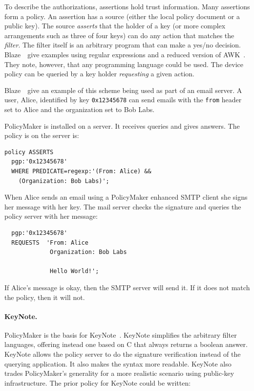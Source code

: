 \documentclass[thesis.tex]{subfiles}
\begin{document}
To describe the authorizations, assertions hold trust information.
Many assertions form a policy. An assertion has a source (either the
local policy document or a public key). The source \emph{asserts} that
the holder of a key (or more complex arrangements such as three of
four keys) can do any action that matches the \emph{filter}. The
filter itself is an arbitrary program that can make a yes/no decision.
Blaze~\etal~give examples using regular expressions and a reduced
version of AWK~\cite{aho_awk-pattern_1979}. They note, however, that
any programming language could be used. The device policy can be
queried by a key holder \emph{requesting} a given action.

Blaze~\etal~give an example of this scheme being used as part of an
email server. A user, Alice, identified by key \texttt{0x12345678} can
send emails with the \texttt{from} header set to Alice and the
organization set to Bob Labs.

PolicyMaker is installed on a server. It receives queries and gives answers.
The policy is on the server is:

\begin{lstlisting}
policy ASSERTS
  pgp:'0x12345678'
  WHERE PREDICATE=regexp:'(From: Alice) &&
    (Organization: Bob Labs)';
\end{lstlisting}

When Alice sends an email using a PolicyMaker enhanced SMTP
client she signs her message with her key.  The mail server
checks the signature and queries the policy server with her message:

\begin{lstlisting}
  pgp:'0x12345678'
  REQUESTS  'From: Alice
             Organization: Bob Labs

             Hello World!';
\end{lstlisting}

If Alice's message is okay, then the SMTP server will send it.  If it does not match the policy, then it will not.

\paragraph*{KeyNote.}
PolicyMaker is the basis for KeyNote~\cite{blaze_role_1999,blaze_keynote:_1998}.
KeyNote simplifies the arbitrary filter languages, offering instead one based on
C that always returns a boolean answer. KeyNote allows the policy server to do
the signature verification instead of the querying application. It also makes the
syntax more readable. KeyNote also trades PolicyMaker's generality for a more
realistic scenario using public-key infrastructure. The prior policy for KeyNote
could be written:
\end{document}
